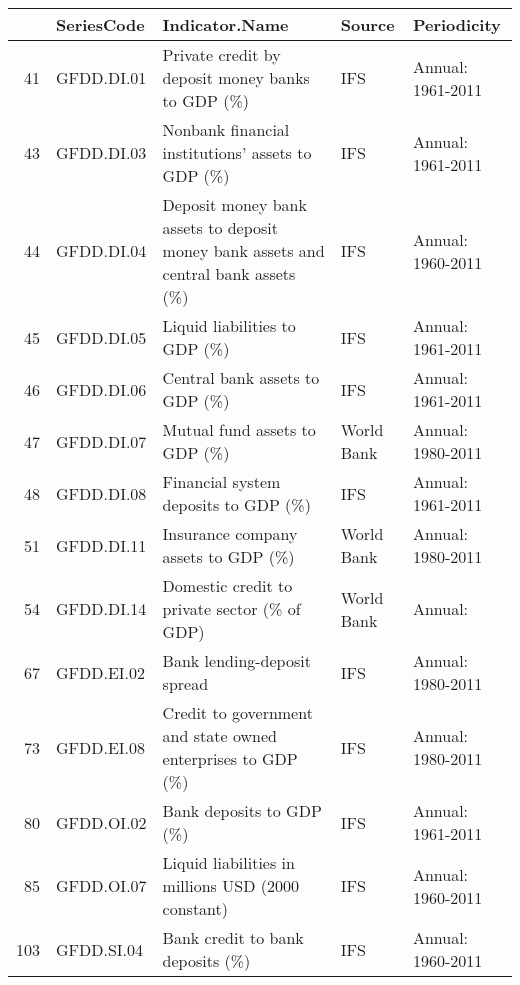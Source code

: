 \begin{tabular}{rllll}
  \hline
 & SeriesCode & Indicator.Name & Source & Periodicity \\ 
  \hline
41 & GFDD.DI.01 & Private credit by deposit money banks to GDP (\%) & IFS & Annual: 1961-2011 \\ 
  43 & GFDD.DI.03 & Nonbank financial institutions' assets to GDP (\%) & IFS & Annual: 1961-2011 \\ 
  44 & GFDD.DI.04 & Deposit money bank assets to deposit money bank assets and central bank assets (\%) & IFS & Annual: 1960-2011 \\ 
  45 & GFDD.DI.05 & Liquid liabilities to GDP (\%) & IFS & Annual: 1961-2011 \\ 
  46 & GFDD.DI.06 & Central bank assets to GDP (\%) & IFS & Annual: 1961-2011 \\ 
  47 & GFDD.DI.07 & Mutual fund assets to GDP (\%) & World Bank & Annual: 1980-2011 \\ 
  48 & GFDD.DI.08 & Financial system deposits to GDP (\%) & IFS & Annual: 1961-2011 \\ 
  51 & GFDD.DI.11 & Insurance company assets to GDP (\%) & World Bank & Annual: 1980-2011 \\ 
  54 & GFDD.DI.14 & Domestic credit to private sector (\% of GDP) & World Bank & Annual: \\ 
  67 & GFDD.EI.02 & Bank lending-deposit spread & IFS & Annual: 1980-2011 \\ 
  73 & GFDD.EI.08 & Credit to government and state owned enterprises to GDP (\%) & IFS & Annual: 1980-2011 \\ 
  80 & GFDD.OI.02 & Bank deposits to GDP (\%) & IFS & Annual: 1961-2011 \\ 
  85 & GFDD.OI.07 & Liquid liabilities in millions USD (2000 constant) & IFS & Annual: 1960-2011 \\ 
  103 & GFDD.SI.04 & Bank credit to bank deposits (\%) & IFS & Annual: 1960-2011 \\ 
   \hline
\end{tabular}
